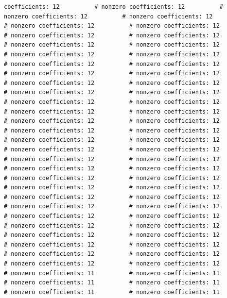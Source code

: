 \documentclass[
]{article}
\begin{document}
\begin{verbatim}
coefficients: 12          # nonzero coefficients: 12          # nonzero coefficients: 12          # nonzero coefficients: 12          # nonzero coefficients: 12          # nonzero coefficients: 12          # nonzero coefficients: 12          # nonzero coefficients: 12          # nonzero coefficients: 12          # nonzero coefficients: 12          # nonzero coefficients: 12          # nonzero coefficients: 12          # nonzero coefficients: 12          # nonzero coefficients: 12          # nonzero coefficients: 12          # nonzero coefficients: 12          # nonzero coefficients: 12          # nonzero coefficients: 12          # nonzero coefficients: 12          # nonzero coefficients: 12          # nonzero coefficients: 12          # nonzero coefficients: 12          # nonzero coefficients: 12          # nonzero coefficients: 12          # nonzero coefficients: 12          # nonzero coefficients: 12          # nonzero coefficients: 12          # nonzero coefficients: 12          # nonzero coefficients: 12          # nonzero coefficients: 12          # nonzero coefficients: 12          # nonzero coefficients: 12          # nonzero coefficients: 12          # nonzero coefficients: 12          # nonzero coefficients: 12          # nonzero coefficients: 12          # nonzero coefficients: 12          # nonzero coefficients: 12          # nonzero coefficients: 12          # nonzero coefficients: 12          # nonzero coefficients: 12          # nonzero coefficients: 12          # nonzero coefficients: 12          # nonzero coefficients: 12          # nonzero coefficients: 12          # nonzero coefficients: 12          # nonzero coefficients: 12          # nonzero coefficients: 12          # nonzero coefficients: 12          # nonzero coefficients: 12          # nonzero coefficients: 12          # nonzero coefficients: 12          # nonzero coefficients: 12          # nonzero coefficients: 12          # nonzero coefficients: 12          # nonzero coefficients: 12          # nonzero coefficients: 11          # nonzero coefficients: 11          # nonzero coefficients: 11          # nonzero coefficients: 11          # nonzero coefficients: 11          # nonzero coefficients: 11          

\end{verbatim}
\end{document}
